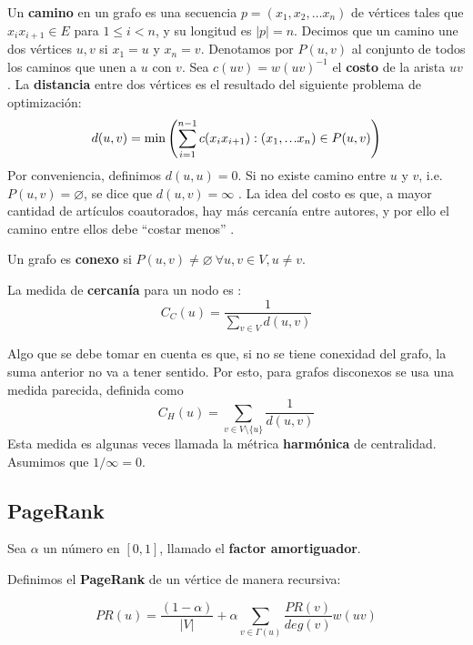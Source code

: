 \documentclass[journal]{IEEEtran}
\newcommand\mydots{\hbox to 1em{.\hss.\hss.}}
\begin{document}
Un \textbf{camino} en un grafo es una secuencia \(p = (x_1, x_2, \ldots x_n)\) de vértices tales que \(x_{i}x_{i+1} \in E\) para \(1 \leq i < n\), y su longitud es \(|p| = n\). Decimos que un camino une dos vértices \(u, v\) si \(x_1 = u\) y \(x_n = v\). Denotamos por \(P(u, v)\) al conjunto de todos los caminos que unen a \(u\) con \(v\). Sea \(c(uv) = w(uv)^{-1}\) el \textbf{costo} de la arista \(uv\). La \textbf{distancia} entre dos vértices es el resultado del siguiente problema de optimización:
\begin{equation} \label{eq:distance}
d(u, v) = \min \left(\sum_{i=1}^{n-1} c(x_{i}x_{i+1}) : (x_1, \mydots x_n) \in P(u, v)\right)
\end{equation}
Por conveniencia, definimos \(d(u, u) = 0\). Si no existe camino entre \(u\) y \(v\), i.e. \(P(u, v) = \varnothing\), se dice que \(d(u, v) = \infty\) \cite{bollobas}. La idea del costo es que, a mayor cantidad de artículos coautorados, hay más cercanía entre autores, y por ello el camino entre ellos debe ``costar menos'' \cite{newman}.

Un grafo es \textbf{conexo} si \(P(u, v) \neq \varnothing~\forall u, v \in V, u \neq v\).

La medida de \textbf{cercanía} para un nodo es \cite{brandes}:
\begin{equation} \label{eq:close}
C_C (u) = \frac{1}{\sum_{v \in V} d(u, v)}
\end{equation}

Algo que se debe tomar en cuenta es que, si no se tiene conexidad del grafo, la suma anterior no va a tener sentido. Por esto, para grafos disconexos se usa una medida parecida, definida como
\begin{equation}
C_H (u) = \sum_{v \in V \setminus \{u\}} \frac{1}{d(u, v)}
\end{equation}
Esta medida es algunas veces llamada la métrica \textbf{harmónica} de centralidad\cite{rochat}. Asumimos que \(1/\infty = 0\).

\subsection{PageRank}

Sea \(\alpha\) un número en \([0, 1]\), llamado el \textbf{factor amortiguador}.

Definimos el \textbf{PageRank} de un vértice de manera recursiva:

\begin{equation} \label{eq:pagerank}
	PR(u) = \frac{(1-\alpha)}{|V|} + \alpha \sum_{v \in \Gamma(u)} \frac{PR(v)}{deg(v)} w(uv)
\end{equation}
\end{document}
